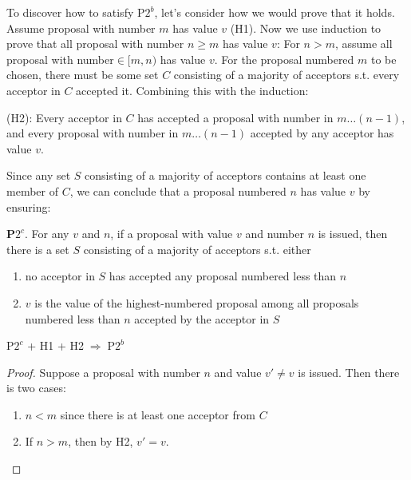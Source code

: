 \documentclass[11pt]{article}
\begin{document}
To discover how to satisfy P\(2^b\), let's consider how we would prove that it holds. Assume proposal
with number \(m\) has value \(v\) (H1). Now we use induction to prove that all proposal with number
\(n\ge m\) has value \(v\): For \(n>m\), assume all proposal with number\(\in[m,n)\) has value \(v\).
For the proposal numbered \(m\) to be chosen, there must be some set \(C\) consisting of a majority of
acceptors s.t. every acceptor in \(C\) accepted it. Combining this with the induction:

\begin{proposition}[]
(H2): Every acceptor in \(C\) has accepted a proposal with number in \(m\dots(n-1)\), and every proposal
with number in \(m\dots(n-1)\) accepted by any acceptor has value \(v\).
\end{proposition}

Since any set \(S\) consisting of a majority of acceptors contains at least one member of \(C\), we
can conclude that a proposal numbered \(n\) has value \(v\) by ensuring:

\textbf{P\(2^c\)}. For any \(v\) and \(n\), if a proposal with value \(v\) and number \(n\) is issued, then
there is a set \(S\) consisting of a majority of acceptors s.t. either
\begin{enumerate}
\item no acceptor in \(S\) has accepted any proposal numbered less than \(n\)
\item \(v\) is the value of the highest-numbered proposal among all proposals numbered less than \(n\)
accepted by the acceptor in \(S\)
\end{enumerate}

\begin{proposition}[]
P\(2^c\) + H1 + H2\(\;\Rightarrow\;\)P\(2^b\)
\end{proposition}

\begin{proof}
Suppose a proposal with number \(n\) and value \(v'\neq v\) is issued. Then there is two cases:
\begin{enumerate}
\item \(n<m\) since there is at least one acceptor from \(C\)
\item If \(n>m\), then by H2, \(v'=v\).
\end{enumerate}
\end{proof}
\end{document}
